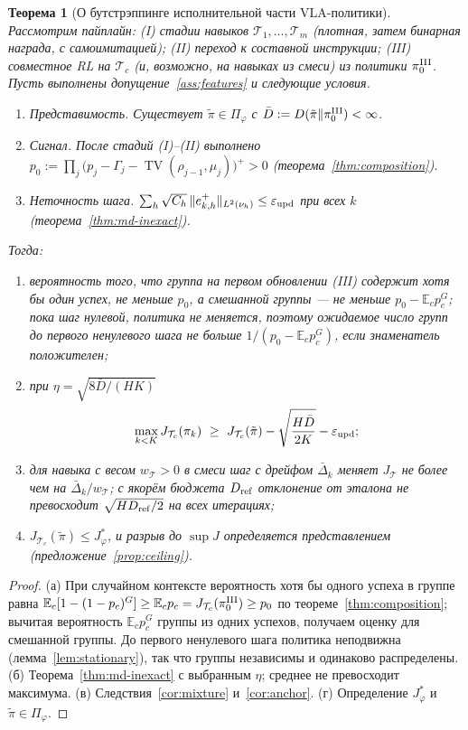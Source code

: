 \documentclass[11pt,a4paper]{article}
\theoremstyle{plain}
\newtheorem{theorem}{Теорема}[section]
\theoremstyle{definition}
\theoremstyle{remark}
\newcommand{\E}{\mathbb{E}}
\DeclareMathOperator{\TV}{TV}
\newcommand{\cT}{\mathcal{T}}
\newcommand{\pit}{\tilde\pi}
\begin{document}
\begin{theorem}[О бутстрэппинге исполнительной части VLA-политики]\label{thm:main}
Рассмотрим пайплайн: (I) стадии навыков $\cT_1,\dots,\cT_m$ (плотная, затем бинарная награда, с самоимитацией); (II) переход к составной инструкции; (III) совместное RL на $\cT_c$ (и, возможно, на навыках из смеси) из политики $\pi^{\rm III}_0$. Пусть выполнены допущение~\ref{ass:features} и следующие условия.
\begin{enumerate}[label=(A\arabic*)]
\item \emph{Представимость.} Существует $\pit\in\Pi_\varphi$ с $\bar D:=D(\pit\|\pi^{\rm III}_0)<\infty$.
\item \emph{Сигнал.} После стадий (I)--(II) выполнено $p_0:=\prod_j\bigl(p_j-\Gamma_j-\TV(\rho_{j-1},\mu_j)\bigr)^+>0$ (теорема~\ref{thm:composition}).
\item \emph{Неточность шага.} $\sum_h\sqrt{C_h}\,\|e^+_{k,h}\|_{L^2(\nu_h)}\le\varepsilon_{\rm upd}$ при всех $k$ (теорема~\ref{thm:md-inexact}).
\end{enumerate}
Тогда:
\begin{enumerate}[label=(\alph*)]
\item вероятность того, что группа на первом обновлении (III) содержит хотя бы один успех, не меньше $p_0$, а смешанной группы --- не меньше $p_0-\E_cp_c^G$; пока шаг нулевой, политика не меняется, поэтому ожидаемое число групп до первого ненулевого шага не больше $1/(p_0-\E_cp_c^G)$, если знаменатель положителен;
\item при $\eta=\sqrt{8\bar D/(HK)}$
\[
\max_{k<K}J_{\cT_c}(\pi_k)\ \ge\ J_{\cT_c}(\pit)-\sqrt{\frac{H\bar D}{2K}}-\varepsilon_{\rm upd};
\]
\item для навыка с весом $w_\cT>0$ в смеси шаг с дрейфом $\bar\Delta_k$ меняет $J_\cT$ не более чем на $\bar\Delta_k/w_\cT$; с якорём бюджета $D_{\rm ref}$ отклонение от эталона не превосходит $\sqrt{HD_{\rm ref}/2}$ на всех итерациях;
\item $J_{\cT_c}(\pit)\le J^\ast_\varphi$, и разрыв до $\sup J$ определяется представлением (предложение~\ref{prop:ceiling}).
\end{enumerate}
\end{theorem}
\begin{proof}
(а) При случайном контексте вероятность хотя бы одного успеха в группе равна $\E_c[1-(1-p_c)^G]\ge\E_cp_c=J_{\cT_c}(\pi^{\rm III}_0)\ge p_0$ по теореме~\ref{thm:composition}; вычитая вероятность $\E_cp_c^G$ группы из одних успехов, получаем оценку для смешанной группы. До первого ненулевого шага политика неподвижна (лемма~\ref{lem:stationary}), так что группы независимы и одинаково распределены.
(б) Теорема~\ref{thm:md-inexact} с выбранным $\eta$; среднее не превосходит максимума.
(в) Следствия~\ref{cor:mixture} и~\ref{cor:anchor}.
(г) Определение $J^\ast_\varphi$ и $\pit\in\Pi_\varphi$.
\end{proof}
\end{document}
